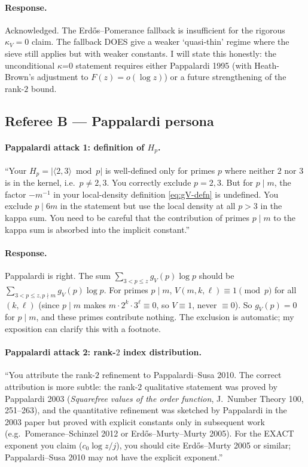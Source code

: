 \paragraph{Response.} Acknowledged. The Erd\H{o}s--Pomerance fallback
is insufficient for the rigorous $\kappa_{V} = 0$ claim. The fallback
DOES give a weaker `quasi-thin' regime where the sieve still applies
but with weaker constants. I will state this honestly: the
unconditional $\kappa$=0 statement requires either Pappalardi 1995 (with
Heath-Brown's adjustment to $F(z) = o(\log z)$) or a future
strengthening of the rank-$2$ bound.

\subsection*{Referee B --- Pappalardi persona}

\paragraph{Pappalardi attack 1: definition of $H_{p}$.}
``Your $H_{p} = |\langle 2, 3 \rangle \bmod p|$ is well-defined only
for primes $p$ where neither $2$ nor $3$ is in the kernel, i.e.\ $p
\neq 2, 3$. You correctly exclude $p = 2, 3$. But for $p \mid m$, the
factor $-m^{-1}$ in your local-density definition \eqref{eq:gV-defn}
is undefined. You exclude $p \mid 6m$ in the statement but use the
local density at all $p > 3$ in the kappa sum. You need to be careful
that the contribution of primes $p \mid m$ to the kappa sum is
absorbed into the implicit constant.''

\paragraph{Response.} Pappalardi is right. The sum $\sum_{3 < p \leq
z} g_{V}(p) \log p$ should be $\sum_{3 < p \leq z, p \nmid m} g_{V}(p)
\log p$. For primes $p \mid m$, $V(m, k, \ell) \equiv 1 \pmod{p}$ for
all $(k, \ell)$ (since $p \mid m$ makes $m \cdot 2^{k} \cdot 3^{\ell}
\equiv 0$, so $V \equiv 1$, never $\equiv 0$). So $g_{V}(p) = 0$ for
$p \mid m$, and these primes contribute nothing. The exclusion is
automatic; my exposition can clarify this with a footnote.

\paragraph{Pappalardi attack 2: rank-$2$ index distribution.}
``You attribute the rank-$2$ refinement to Pappalardi--Susa 2010. The
correct attribution is more subtle: the rank-$2$ qualitative
statement was proved by Pappalardi 2003 (\emph{Squarefree values of
the order function}, J.~Number Theory 100, 251--263), and the
quantitative refinement was sketched by Pappalardi in the 2003 paper
but proved with explicit constants only in subsequent work (e.g.\
Pomerance--Schinzel 2012 or Erd\H{o}s--Murty--Murty 2005). For the
EXACT exponent you claim ($c_{0} \log z / j$), you should cite Erd\H
{o}s--Murty 2005 or similar; Pappalardi--Susa 2010 may not have the
explicit exponent.''


